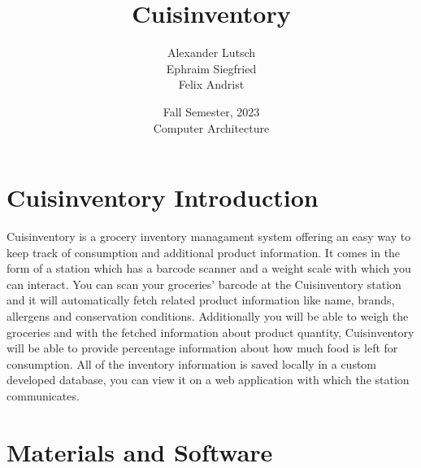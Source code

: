 \documentclass{article}
\author{Alexander Lutsch\\Ephraim Siegfried\\Felix Andrist}
\title{ \Huge Cuisinventory }
\date{Fall Semester, 2023 \\ Computer Architecture}
\begin{document}
\maketitle

\section{Cuisinventory Introduction}
Cuisinventory is a grocery inventory managament system offering an easy way to keep track of consumption and additional product information.
It comes in the form of a station which has a barcode scanner and a weight scale with which you can interact. You can scan your groceries' barcode at the Cuisinventory station and
it will automatically fetch related product information like name, brands, allergens and conservation conditions. Additionally you will be able to weigh the groceries and with the fetched information about product quantity,
Cuisinventory will be able to provide percentage information about how much food is left for consumption. All of the inventory information is saved locally in a custom developed database, you can view it on a web application with which the station communicates.

\section{Materials and Software}
\end{document}
